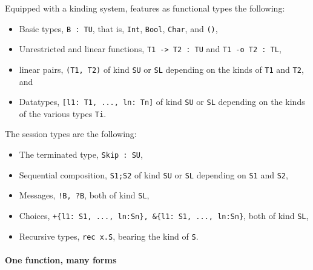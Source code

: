 Equipped with a kinding system, \freest{} features as functional types
the following:
%
\begin{itemize}
\item Basic types, \lstinline|B : TU|, that is, \lstinline|Int|,
  \lstinline|Bool|, \lstinline|Char|, and \lstinline|()|,
\item Unrestricted and linear functions, \lstinline|T1 -> T2 : TU| and
  \lstinline|T1 -o T2 : TL|,
\item linear pairs, \lstinline|(T1, T2)| of kind \lstinline|SU| or
  \lstinline|SL| depending on the kinds of \lstinline|T1| and
  \lstinline|T2|, and
\item Datatypes, \lstinline|[l1: T1, ..., ln: Tn]| of kind
  \lstinline|SU| or \lstinline|SL| depending on the kinds of the
  various types \lstinline|Ti|.
\end{itemize}

The session types are the following:
\begin{itemize}
\item The terminated type, \lstinline|Skip : SU|,
\item Sequential composition, \lstinline|S1;S2| of kind \lstinline|SU|
  or \lstinline|SL| depending on \lstinline|S1| and \lstinline|S2|,
\item  Messages, \lstinline|!B, ?B|, both of kind \lstinline|SL|,
\item Choices, \lstinline|+{l1: S1, ..., ln:Sn}, &{l1: S1, ..., ln:Sn}|,
  both of kind \lstinline|SL|,
\item Recursive types, \lstinline|rec x.S|, bearing the kind of
  \lstinline|S|.
\end{itemize}

\paragraph{One function, many forms}

